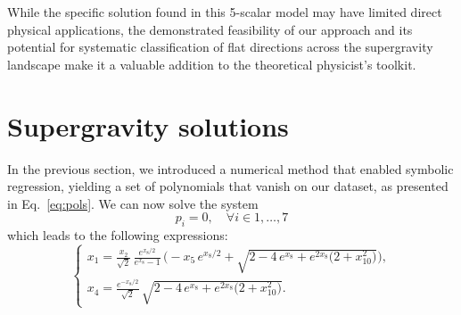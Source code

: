 \documentclass[11pt]{article}
\newcommand{\ce}[1]{\marginpar{\parbox{\marginparwidth}{\boldmath $\Longleftarrow$}}{\boldmath\bfseries (ce: #1)}}
\begin{document}
While the specific solution found in this 5-scalar model may have limited direct physical applications, the demonstrated feasibility of our approach and its potential for systematic classification of flat directions across the supergravity landscape make it a valuable addition to the theoretical physicist's toolkit.

\appendix
\section{Supergravity solutions}


In the previous section, we introduced a numerical method that enabled symbolic regression, yielding a set of polynomials that vanish on our dataset, as presented in Eq.~\ref{eq:pols}. We can now solve the system
\begin{equation}\label{eq:solvepol}
	p_i = 0, \quad \forall i \in {1,\dots,7}
\end{equation}
which leads to the following expressions:
\begin{equation}
	\begin{cases}
		\displaystyle x_{1} = \frac{x_{2}}{\sqrt{2}}\,\frac{e^{x_{8}/2}}{e^{x_{8}}-1}\,\Big(-x_{5}\,e^{x_{8}/2} + \sqrt{2-4\,e^{x_{8}}+e^{2x_{8}}\big(2+x_{10}^{2}\big)}\Big),\\[8pt]
		\displaystyle x_{4} = \frac{e^{-x_{8}/2}}{\sqrt{2}}\,\sqrt{2-4\,e^{x_{8}}+e^{2x_{8}}\big(2+x_{10}^{2}\big)}.
	\end{cases}
\end{equation}
\end{document}
